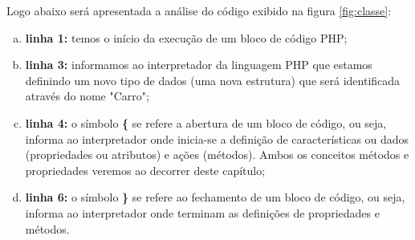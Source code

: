 \newpage

Logo abaixo será apresentada a análise do código exibido na
figura \ref{fig:classe}:

\begin{enumerate}[a)]
    \item \textbf{linha 1:} temos o início da execução de um bloco de código
    PHP;
    \item \textbf{linha 3:} informamos ao interpretador da linguagem PHP que 
    estamos definindo um novo tipo de dados (uma nova estrutura) que será 
    identificada através do nome "Carro";
    \item \textbf{linha 4:} o símbolo \textbf{\{} se refere a abertura de um
    bloco de código, ou seja, informa ao interpretador onde inicia-se a definição de 
    características ou dados (propriedades ou atributos) e ações (métodos). 
    Ambos os conceitos métodos e propriedades veremos ao decorrer deste
    capítulo;
    \item \textbf{linha 6:} o símbolo \textbf{\}} se refere ao fechamento de um
    bloco de código, ou seja, informa ao interpretador onde terminam as
    definições de propriedades e métodos.
\end{enumerate}